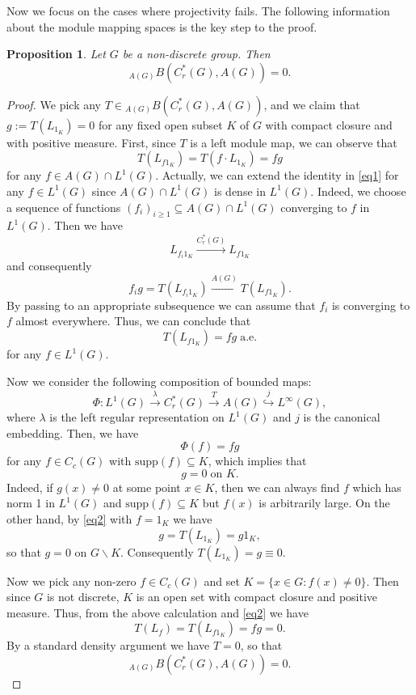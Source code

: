 \documentclass[10pt]{amsart}
\newtheorem{prop}[thm]{Proposition}
\numberwithin{thm}{section}
\numberwithin{equation}{section}
\begin{document}
Now we focus on the cases where projectivity fails. The following information about the module mapping spaces is the key step to the proof. 
	\begin{prop}\label{prop-trivial-mapping-space}
	Let $G$ be a non-discrete group. Then
		$${}_{A(G)}B(C^*_r(G), A(G)) = 0.$$
	\end{prop}
\begin{proof}
We pick any $T \in {}_{A(G)}B(C^*_r(G) , A(G))$, and we claim that $g := T(L_{1_K}) = 0$
for any fixed open subset $K$ of $G$ with compact closure and with positive measure.
First, since $T$ is a left module map, we can observe that
	\begin{equation}\label{eq1}
	T(L_{f 1_K}) = T(f \cdot L_{1_K}) = f g
	\end{equation}
for any $f \in A(G)\cap L^1(G)$.
Actually, we can extend the identity in \eqref{eq1} for any $f \in L^1(G)$ since $A(G)\cap L^1(G)$ is dense in $L^1(G)$.
Indeed, we choose a sequence of functions $(f_i)_{i\ge 1} \subseteq A(G) \cap L^1(G)$ converging to $f$ in $L^1(G)$.
Then we have
	$$L_{f_i 1_K} \stackrel{C^*_r(G)}{\longrightarrow} L_{f 1_K}$$
and consequently
	$$f_i g = T(L_{f_i 1_K}) \stackrel{A(G)}{\longrightarrow} T(L_{f 1_K}).$$
By passing to an appropriate subsequence we can assume that $f_i$ is converging to $f$ almost everywhere.
Thus, we can conclude that
	\begin{equation}\label{eq2}
	T(L_{f 1_K}) = f g\;\text{a.e.}
	\end{equation}
for any $f\in L^1(G)$.

Now we consider the following composition of bounded maps:
	$$\Phi : L^1(G) \stackrel{\lambda}{\longrightarrow} C^*_r(G) \stackrel{T}{\longrightarrow} A(G) \stackrel{j}{\hookrightarrow} L^{\infty}(G),$$
where $\lambda$ is the left regular representation on $L^1(G)$ and $j$ is the canonical embedding. Then, we have
	$$\Phi(f) = f g$$
for any $f\in C_c(G)$ with $\text{supp}(f) \subseteq K$, which implies that
	$$g=0 \;\text{on $K$}.$$
Indeed, if $g(x) \neq 0$ at some point $x\in K$,
then we can always find $f$ which has norm 1 in $L^1(G)$ and $\text{supp}(f) \subseteq K$ but $f(x)$ is arbitrarily large.
On the other hand, by \eqref{eq2} with $f = 1_K$ we have
	$$g = T(L_{1_K}) = g 1_K,$$
so that $g = 0$ on $G\backslash K$. Consequently $T(L_{1_K}) = g \equiv 0$.

Now we pick any non-zero $f \in C_c(G)$ and set $K = \{ x\in G : f(x)\neq 0\}$.
Then since $G$ is not discrete, $K$ is an open set with compact closure and positive measure.
Thus, from the above calculation and \eqref{eq2} we have
	$$T(L_f) = T(L_{f 1_K}) = f g = 0.$$
By a standard density argument we have $T = 0$, so that
	$${}_{A(G)}B(C^*_r(G), A(G)) = 0.$$
\end{proof}
\end{document}
